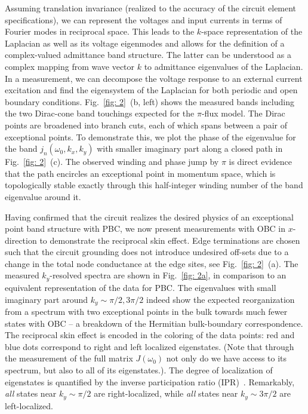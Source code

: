 Assuming translation invariance (realized to the accuracy of the circuit element specifications), we can represent the voltages and input currents in terms of Fourier modes in reciprocal space. This leads to the $k$-space representation of the Laplacian as well as its voltage eigenmodes and allows for the definition of a complex-valued admittance band structure. The latter can be understood as a complex mapping from wave vector $k$ to admittance eigenvalues of the Laplacian. In a measurement, we can decompose the voltage response to an external current excitation and find the eigensystem of the Laplacian for both periodic and open boundary conditions. Fig.~\ref{fig: 2}~(b, left) shows the measured bands including the two Dirac-cone band touchings expected for the $\pi$-flux model. The Dirac points are broadened into branch cuts, each of which spans between a pair of exceptional points. To demonstrate this, we plot the phase of the eigenvalue for the band $j_n(\omega_0,k_x,k_y)$ with smaller imaginary part along a closed path in Fig.~\ref{fig: 2}~(c). The observed winding and phase jump by $\pi$ is direct evidence that the path encircles an exceptional point in momentum space, which is topologically stable exactly through this half-integer winding number of the band eigenvalue around it.

Having confirmed that the circuit realizes the desired physics of an exceptional point band structure with PBC, we now present measurements with OBC in $x$-direction to demonstrate the reciprocal skin effect. Edge terminations are chosen such that the circuit grounding does not introduce undesired off-sets due to a change in the total node conductance at the edge sites, see Fig.~\ref{fig: 2}~(a). The measured $k_y$-resolved spectra are shown in Fig.~\ref{fig: 2a}, in comparison to an equivalent representation of the data for PBC. The eigenvalues with small imaginary part around $k_y\sim \pi/2, 3\pi/2$ indeed show the expected reorganization from a spectrum with two exceptional points in the bulk towards much fewer states with OBC -- a breakdown of the Hermitian bulk-boundary correspondence. The reciprocal skin effect is encoded in the coloring of the data points: red and blue dots correspond to right and left localized eigenstates. (Note that through the measurement of the full matrix $J(\omega_0)$ not only do we have access to its spectrum, but also to all of its eigenstates.). The degree of localization of eigenstates is quantified by the inverse participation ratio (IPR)~\cite{ipr}. Remarkably, \emph{all} states near $k_y\sim \pi/2$ are right-localized, while \emph{all} states near $k_y\sim 3\pi/2$ are left-localized.

